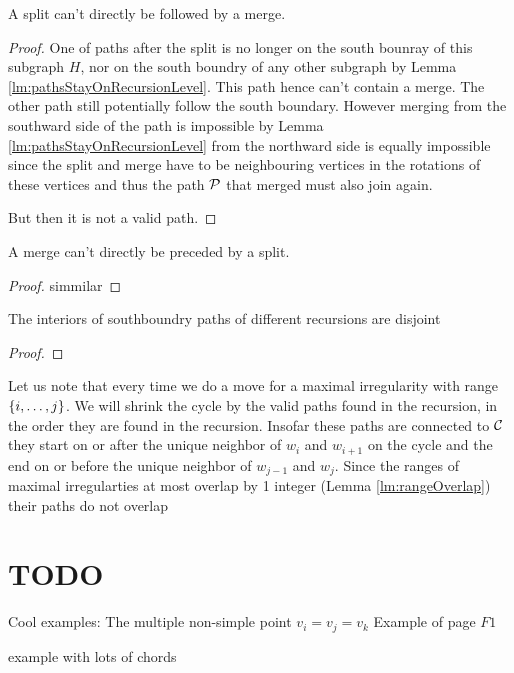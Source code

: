 \begin{lemma}
  A split can't directly be followed by a merge.
\end{lemma}
\begin{proof}
  One of paths after the split is no longer on the south bounray of this subgraph $H$, nor on the south boundry of any other subgraph by Lemma \ref{lm:pathsStayOnRecursionLevel}. This path hence can't contain a merge. The other path still potentially follow the south boundary. However merging from the southward side of the path is impossible by Lemma \ref{lm:pathsStayOnRecursionLevel} from the northward side is equally impossible since the split and merge have to be neighbouring vertices in the rotations of these vertices and thus the path $\P$ that merged must also join again.

  But then it is not a valid path.
\end{proof}

\begin{lemma}
  A merge can't directly be preceded by a split.
\end{lemma}
\begin{proof}
  simmilar  
\end{proof}




\begin{lemma}
The interiors of southboundry paths of different recursions are disjoint
\end{lemma}

\begin{proof}
\end{proof}



Let us note that every time we do a move for a maximal irregularity with range $\braces{i, \ldots, j}$.
 We will shrink the cycle by the valid paths found in the recursion, in the order they are found in the recursion.
Insofar these paths are connected to $\C$ they start on or after the unique neighbor of $w_i$ and $w_{i+1}$ on the cycle and the end on or before the unique neighbor of $w_{j-1}$ and $w_j$.
Since the ranges of maximal irregularties at most overlap by 1 integer (Lemma \ref{lm:rangeOverlap}) their paths do not overlap


\section{TODO}
Cool examples: The multiple non-simple point $v_i = v_j =v_k$
Example of page $F1$

example with lots of chords
